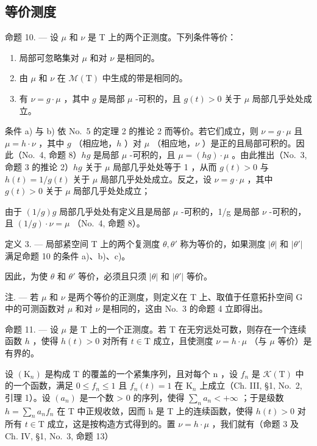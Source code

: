 \subsection{等价测度}

命题 10. --- 设 \(\mu\) 和 \(\nu\) 是 T 上的两个正测度。下列条件等价：

\begin{enumerate}
\def\labelenumi{\alph{enumi})}
\item
  局部可忽略集对 \(\mu\) 和对 \(\nu\) 是相同的。
\item
  由 \(\mu\) 和 \(\nu\) 在 \(\mathcal{M}(\mathrm{T})\) 中生成的带是相同的。
\item
  有 \(\nu = g \cdot \mu\) ，其中 \(g\) 是局部 \(\mu\) -可积的，且 \(g(t) > 0\) 关于 \(\mu\) 局部几乎处处成立。
\end{enumerate}

条件 a) 与 b) 依 No.~5 的定理 2 的推论 2 而等价。若它们成立，则 \(\nu = g \cdot \mu\) 且 \(\mu = h \cdot \nu\) ，其中 \(g\) （相应地，\(h\) ）对 \(\mu\) （相应地，\(\nu\) ）是正的且局部可积的。因此（No.~4, 命题 8）\(hg\) 是局部 \(\mu\) -可积的，且 \(\mu = (hg) \cdot \mu\) 。由此推出（No.~3, 命题 3 的推论 2）\(hg\) 关于 \(\mu\) 局部几乎处处等于 1 ，从而 \(g(t) > 0\) 与 \(h(t) = 1/g(t)\) 关于 \(\mu\) 局部几乎处处成立。反之，设 \(\nu = g \cdot \mu\) ，其中 \(g(t) > 0\) 关于 \(\mu\) 局部几乎处处成立；

由于 \((1/g)g\) 局部几乎处处有定义且是局部 \(\mu\) -可积的，1/g 是局部 \(\nu\) -可积的，且 \((1/g)\cdot\nu=\mu\) （No.~4, 命题 8）。

定义 3. --- 局部紧空间 T 上的两个复测度 \(\theta, \theta'\) 称为等价的，如果测度 \(|\theta|\) 和 \(|\theta'|\) 满足命题 10 的条件 a)、b)、c)。

因此，为使 \(\theta\) 和 \(\theta'\) 等价，必须且只须 \(|\theta|\) 和 \(|\theta'|\) 等价。

注. --- 若 \(\mu\) 和 \(\nu\) 是两个等价的正测度，则定义在 T 上、取值于任意拓扑空间 G 中的可测函数对 \(\mu\) 和对 \(\nu\) 是相同的，这由 No.~3 的命题 4 立即得出。

命题 11. --- 设 \(\mu\) 是 T 上的一个正测度。若 T 在无穷远处可数，则存在一个连续函数 \(h\) ，使得 \(h(t) > 0\) 对所有 \(t \in \mathrm{T}\) 成立，且使测度 \(\nu = h \cdot \mu\) （与 \(\mu\) 等价）是有界的。

设 \((\mathrm{K}_{n})\) 是构成 T 的覆盖的一个紧集序列，且对每个 n ，设 \(f_{n}\) 是 \(\mathcal{K}(\mathrm{T})\) 中的一个函数，满足 \(0 \leqslant f_{n} \leqslant 1\) 且 \(f_{n}(t) = 1\) 在 \(\mathrm{K}_{n}\) 上成立（Ch. III, §1, No.~2, 引理 1）。设 \((a_{n})\) 是一个数 \textgreater{} 0 的序列，使得 \(\sum_{n} a_{n} < +\infty\) ；于是级数 \(h = \sum_{n} a_{n} f_{n}\) 在 T 中正规收敛，因而 h 是 T 上的连续函数，使得 \(h(t) > 0\) 对所有 \(t \in \mathrm{T}\) 成立，这是按构造方式得到的。置 \(\nu = h \cdot \mu\) ，我们就有（命题 3 及 Ch. IV, §1, No.~3, 命题 13）

